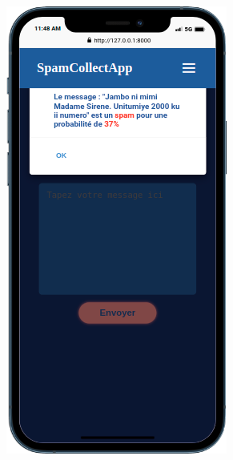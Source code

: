\documentclass[12pt,a4paper, oneside]{book}
\begin{document}
\begin{figure}[h]
\begin{subfigure}{3.5cm}
		\caption{}
		\label{fig:mobilespamtest}
	\end{subfigure} 
	\begin{subfigure}{3.5cm}
		\centering
		\includegraphics[width=1\linewidth]{CollectImages/mobilePoneTestAnswer}
		\caption{}
		\label{fig:mobileponetestanswer}
	\end{subfigure}  
\end{figure}
\end{document}
